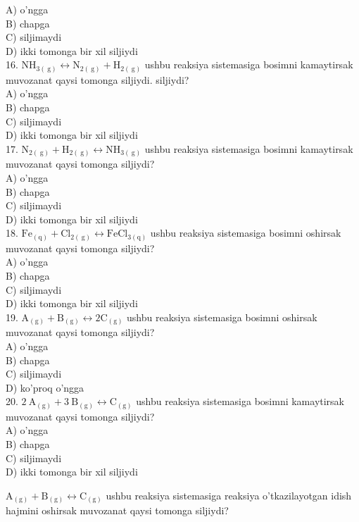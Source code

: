 A) o'ngga\\
B) chapga\\
C) siljimaydi\\
D) ikki tomonga bir xil siljiydi\\
16. $\mathrm{NH}_{3(\mathrm{~g})} \leftrightarrow \mathrm{N}_{2(\mathrm{~g})}+\mathrm{H}_{2(\mathrm{~g})}$ ushbu reaksiya sistemasiga bosimni kamaytirsak muvozanat qaysi tomonga siljiydi. siljiydi?\\
A) o'ngga\\
B) chapga\\
C) siljimaydi\\
D) ikki tomonga bir xil siljiydi\\
17. $\mathrm{N}_{2(\mathrm{~g})}+\mathrm{H}_{2(\mathrm{~g})} \leftrightarrow \mathrm{NH}_{3(\mathrm{~g})}$ ushbu reaksiya sistemasiga bosimni kamaytirsak muvozanat qaysi tomonga siljiydi?\\
A) o'ngga\\
B) chapga\\
C) siljimaydi\\
D) ikki tomonga bir xil siljiydi\\
18. $\mathrm{Fe}_{(\mathrm{q})}+\mathrm{Cl}_{2(\mathrm{~g})} \leftrightarrow \mathrm{FeCl}_{3(\mathrm{q})}$ ushbu reaksiya sistemasiga bosimni oshirsak muvozanat qaysi tomonga siljiydi?\\
A) o'ngga\\
B) chapga\\
C) siljimaydi\\
D) ikki tomonga bir xil siljiydi\\
19. $\mathrm{A}_{(\mathrm{g})}+\mathrm{B}_{(\mathrm{g})} \leftrightarrow 2 \mathrm{C}_{(\mathrm{g})}$ ushbu reaksiya sistemasiga bosimni oshirsak muvozanat qaysi tomonga siljiydi?\\
A) o'ngga\\
B) chapga\\
C) siljimaydi\\
D) ko'proq o'ngga\\
20. $2 \mathrm{~A}_{(\mathrm{g})}+3 \mathrm{~B}_{(\mathrm{g})} \leftrightarrow \mathrm{C}_{(\mathrm{g})}$ ushbu reaksiya sistemasiga bosimni kamaytirsak muvozanat qaysi tomonga siljiydi?\\
A) o'ngga\\
B) chapga\\
C) siljimaydi\\
D) ikki tomonga bir xil siljiydi
  \item $\mathrm{A}_{(\mathrm{g})}+\mathrm{B}_{(\mathrm{g})} \leftrightarrow \mathrm{C}_{(\mathrm{g})}$ ushbu reaksiya sistemasiga reaksiya o'tkazilayotgan idish hajmini oshirsak muvozanat qaysi tomonga siljiydi?\\
